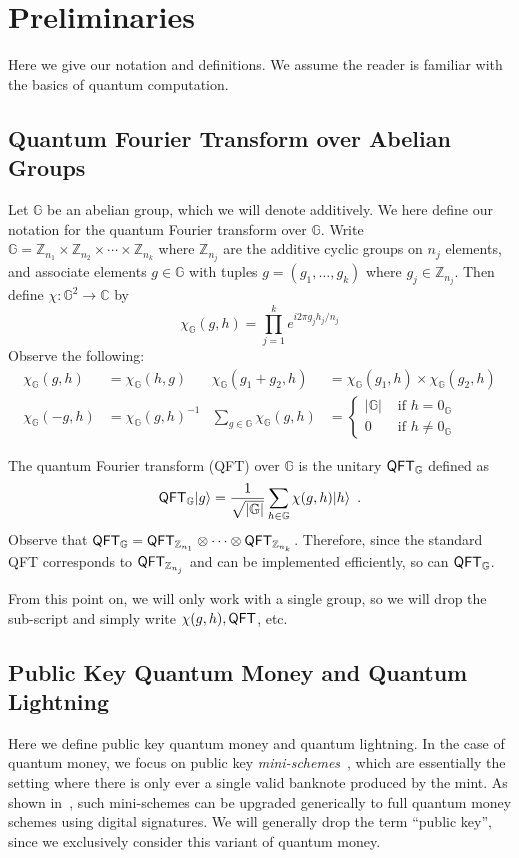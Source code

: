\documentclass{article}\usepackage[a4paper,margin=20mm]{geometry}
\numberwithin{theorem}{section}
\numberwithin{equation}{section}
\newcommand{\Z}{\mathbb{Z}}
\newcommand{\C}{\mathbb{C}}
\newcommand{\G}{\mathbb{G}}
\newcommand{\QFT}{{\sf QFT}}
\begin{document}
\section{Preliminaries}\label{sec:prelim}

Here we give our notation and definitions. We assume the reader is familiar with the basics of quantum computation.

\subsection{Quantum Fourier Transform over Abelian Groups} 

Let $\G$ be an abelian group, which we will denote additively. We here define our notation for the quantum Fourier transform over $\G$. Write $\G=\Z_{n_1}\times \Z_{n_2}\times\cdots\times\Z_{n_k}$ where $\Z_{n_j}$ are the additive cyclic groups on $n_j$ elements, and associate elements $g\in\G$ with tuples $g=(g_1,\dots,g_k)$ where $g_j\in\Z_{n_j}$. Then define $\chi:\G^2\rightarrow\C$ by
\[\chi_\G(g,h)=\prod_{j=1}^k e^{i2\pi g_j h_j/n_j}\]
Observe the following:
\begin{align*}
	\chi_\G(g,h)&=\chi_\G(h,g)&
	\chi_\G(g_1+g_2,h)&=\chi_\G(g_1,h)\times\chi_\G(g_2,h)\\
	\chi_\G(-g,h)&=\chi_\G(g,h)^{-1}&
	\sum_{g\in\G}\chi_\G(g,h)&=\begin{cases}|\G|&\text{ if }h=0_\G\\0&\text{ if }h\neq 0_\G\end{cases}
\end{align*}


The quantum Fourier transform (QFT) over $\G$ is the unitary $\QFT_\G$ defined as 
\[\QFT_\G|g\rangle=\frac{1}{\sqrt{|\G|}}\sum_{h\in\G}\chi(g,h)|h\rangle\enspace.\]
Observe that $\QFT_\G=\QFT_{\Z_{n_1}}\otimes\cdots\otimes\QFT_{\Z_{n_k}}$. Therefore, since the standard QFT corresponds to $\QFT_{\Z_{n_j}}$ and can be implemented efficiently, so can $\QFT_\G$.

From this point on, we will only work with a single group, so we will drop the sub-script and simply write $\chi(g,h),\QFT$, etc.





\subsection{Public Key Quantum Money and Quantum Lightning} 

Here we define public key quantum money and quantum lightning. In the case of quantum money, we focus on public key \emph{mini-schemes}~\cite{DBLP:journals/toc/AaronsonC13}, which are essentially the setting where there is only ever a single valid banknote produced by the mint. As shown in~\cite{DBLP:journals/toc/AaronsonC13}, such mini-schemes can be upgraded generically to full quantum money schemes using digital signatures. We will generally drop the term ``public key'', since we exclusively consider this variant of quantum money. 
\end{document}
